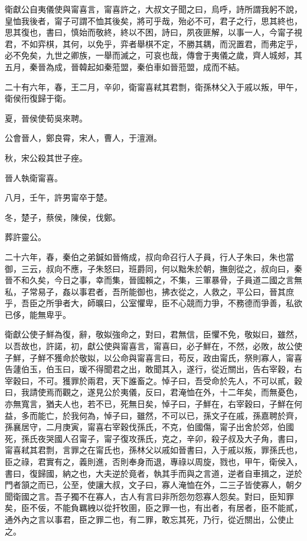 \begin{pinyinscope}
衛獻公自夷儀使與甯喜言，甯喜許之，大叔文子聞之曰，烏呼，詩所謂我躬不說，皇恤我後者，甯子可謂不恤其後矣，將可乎哉，殆必不可，君子之行，思其終也，思其復也，書曰，慎始而敬終，終以不困，詩曰，夙夜匪解，以事一人，今甯子視君，不如弈棋，其何，以免乎，弈者舉棋不定，不勝其耦，而況置君，而弗定乎，必不免矣，九世之卿族，一舉而滅之，可哀也哉，傳會于夷儀之歲，齊人城郟，其五月，秦晉為成，晉韓起如秦蒞盟，秦伯車如晉蒞盟，成而不結。

二十有六年，春，王二月，辛卯，衛甯喜弒其君剽，衛孫林父入于戚以叛，甲午，衛侯衎復歸于衛。

夏，晉侯使荀吳來聘。

公會晉人，鄭良霄，宋人，曹人，于澶淵。

秋，宋公殺其世子痤。

晉人執衛甯喜。

八月，壬午，許男甯卒于楚。

冬，楚子，蔡侯，陳侯，伐鄭。

葬許靈公。

二十六年，春，秦伯之弟鍼如晉脩成，叔向命召行人子員，行人子朱曰，朱也當御，三云，叔向不應，子朱怒曰，班爵同，何以黜朱於朝，撫劍從之，叔向曰，秦晉不和久矣，今日之事，幸而集，晉國賴之，不集，三軍暴骨，子員道二國之言無私，子常易子，姦以事君者，吾所能御也，拂衣從之，人救之，平公曰，晉其庶乎，吾臣之所爭者大，師曠曰，公室懼卑，臣不心競而力爭，不務德而爭善，私欲已侈，能無卑乎。

衛獻公使子鮮為復，辭，敬姒強命之，對曰，君無信，臣懼不免，敬姒曰，雖然，以吾故也，許諾，初，獻公使與甯喜言，甯喜曰，必子鮮在，不然，必敗，故公使子鮮，子鮮不獲命於敬姒，以公命與甯喜言曰，苟反，政由甯氏，祭則寡人，甯喜告蘧伯玉，伯玉曰，瑗不得聞君之出，敢聞其入，遂行，從近關出，告右宰穀，右宰穀曰，不可。獲罪於兩君，天下誰畜之。悼子曰，吾受命於先人，不可以貳，穀曰，我請使焉而觀之，遂見公於夷儀，反曰，君淹恤在外，十二年矣，而無憂色，亦無寬言，猶夫人也，若不已，死無日矣，悼子曰，子鮮在，右宰穀曰，子鮮在何益，多而能亡，於我何為，悼子曰，雖然，不可以已，孫文子在戚，孫嘉聘於齊，孫襄居守，二月庚寅，甯喜右宰穀伐孫氏，不克，伯國傷，甯子出舍於郊，伯國死，孫氏夜哭國人召甯子，甯子復攻孫氏，克之，辛卯，殺子叔及大子角，書曰，甯喜弒其君剽，言罪之在甯氏也，孫林父以戚如晉書曰，入于戚以叛，罪孫氏也，臣之祿，君實有之，義則進，否則奉身而退，專祿以周旋，戮也，甲午，衛侯入，書曰，復歸國，納之也，大夫逆於竟者，執其手而與之言道，逆者自車揖之，逆於門者頷之而已，公至，使讓大叔，文子曰，寡人淹恤在外，二三子皆使寡人，朝夕聞衛國之言。吾子獨不在寡人，古人有言曰非所怨勿怨寡人怨矣。對曰，臣知罪矣，臣不佞，不能負羈絏以從扞牧圉，臣之罪一也，有出者，有居者，臣不能貳，通外內之言以事君，臣之罪二也，有二罪，敢忘其死，乃行，從近關出，公使止之。


\end{pinyinscope}
